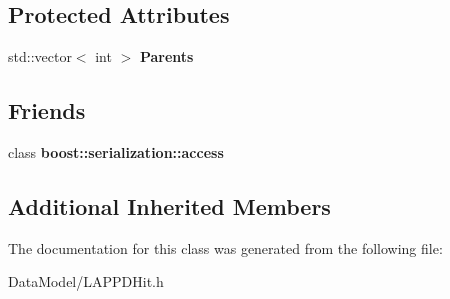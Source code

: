 \subsection*{Protected Attributes}
\begin{DoxyCompactItemize}
\item 
\hypertarget{classMCLAPPDHit_af7f2b72e3e33a3037b5a23b3441c7ce5}{std\-::vector$<$ int $>$ {\bfseries Parents}}\label{classMCLAPPDHit_af7f2b72e3e33a3037b5a23b3441c7ce5}

\end{DoxyCompactItemize}
\subsection*{Friends}
\begin{DoxyCompactItemize}
\item 
\hypertarget{classMCLAPPDHit_ac98d07dd8f7b70e16ccb9a01abf56b9c}{class {\bfseries boost\-::serialization\-::access}}\label{classMCLAPPDHit_ac98d07dd8f7b70e16ccb9a01abf56b9c}

\end{DoxyCompactItemize}
\subsection*{Additional Inherited Members}


The documentation for this class was generated from the following file\-:\begin{DoxyCompactItemize}
\item 
Data\-Model/L\-A\-P\-P\-D\-Hit.\-h\end{DoxyCompactItemize}
